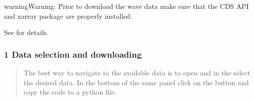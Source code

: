 \documentclass[letterpaper,10pt,english]{sphinxmanual}
\begin{document}
\begin{sphinxadmonition}{warning}{Warning:}
Prior to download the wave data make sure that the CDS API and xarray package are properly installed.

See  for details.
\end{sphinxadmonition}


\subsubsection{1 \sphinxhyphen{} Data selection and downloading}
\label{\detokenize{docs/boundary-conditions:data-selection-and-downloading}}\begin{quote}

The best way to navigate to the available data is to open  and in the  select the desired data. In the bottom of the same panel click on the  button and copy the code to a python file.
\end{quote}
\end{document}
